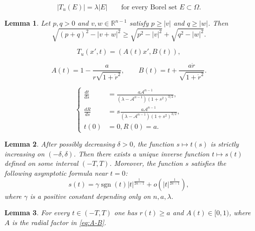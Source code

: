 \documentclass[10pt,a4paper]{amsart}
\newtheorem{lemma}{Lemma}
\newcommand{\Om}{\Omega}
\newcommand{\R}{\mathbb{R}}
\begin{document}
    \begin{equation}\label{eq:T_u-id}
        |T_u(E)|=\lambda|E|\qquad\text{for every Borel set }E\subset\Om.
    \end{equation}

\begin{lemma}\label{lem:in-CS}
    Let $p,q>0$ and $v,w\in\R^{n-1}$ satisfy $p\geq|v|$ and $q\geq|w|$. Then
    \begin{equation}\label{eq:in-CS}
        \sqrt{(p+q)^2-|v+w|^2}\geq\sqrt{p^2-|v|^2}+\sqrt{q^2-|w|^2}.
    \end{equation}
\end{lemma}

\begin{equation}\label{s3:e1}
    T_u(x',t)=(A(t)x',B(t)),
\end{equation}

\begin{equation}\label{eq:A-B}
    A(t)=1-\frac{a}{r\sqrt{1+\dot{r}^2}},\qquad
    B(t)=t+\frac{a\dot{r}}{\sqrt{1+\dot{r}^2}}.
\end{equation}

\begin{equation}\label{eq:ode-sys}
    \left\{
        \begin{aligned}
            \frac{dt}{ds}&=\frac{a\mathcal{A}^{n-1}}{(\lambda-\mathcal{A}^{n-1})(1+s^2)^{3/2}},\\
            \frac{dR}{ds}&=s\frac{a\mathcal{A}^{n-1}}{(\lambda-\mathcal{A}^{n-1})(1+s^2)^{3/2}},\\
            t(0)&=0,R(0)=a.
        \end{aligned}
    \right.
\end{equation}

\begin{lemma}\label{lem:inverse}
    After possibly decreasing $\delta>0$, the function $s\mapsto t(s)$ is strictly increasing on $(-\delta,\delta)$.
    Then there exists a unique inverse function $t\mapsto s(t)$ defined on some interval $(-T,T)$.
    Moreover, the function $s$ satisfies the following asymptotic formula near $t=0$:
    \begin{equation}\label{eq:s-asymp}
        s(t)=\gamma\operatorname{sgn}(t)|t|^{\frac{1}{2n-1}}+o(|t|^{\frac{1}{2n-1}}),
    \end{equation}
    where $\gamma$ is a positive constant depending only on $n,a,\lambda$.
\end{lemma}

\begin{lemma}\label{lem:Ra}
    For every $t\in(-T,T)$ one has $r(t)\geq a$ and $A(t)\in[0,1)$, where $A$ is the radial
    factor in \eqref{eq:A-B}.
\end{lemma}
\end{document}
